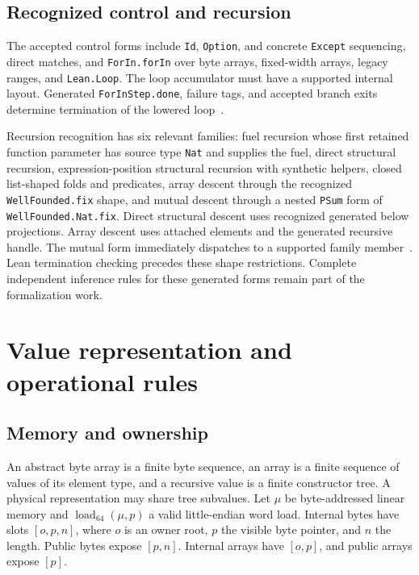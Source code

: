 \documentclass[11pt]{article}
\newcommand{\code}[1]{\texttt{#1}}
\begin{document}
\subsection{Recognized control and recursion}

The accepted control forms include \code{Id}, \code{Option}, and concrete \code{Except} sequencing, direct matches, and \code{ForIn.forIn} over byte arrays, fixed-width arrays, legacy ranges, and \code{Lean.Loop}.  The loop accumulator must have a supported internal layout.  Generated \code{ForInStep.done}, failure tags, and accepted branch exits determine termination of the lowered loop~\cite{patterns,extract}.

Recursion recognition has six relevant families: fuel recursion whose first retained function parameter has source type \code{Nat} and supplies the fuel, direct structural recursion, expression-position structural recursion with synthetic helpers, closed list-shaped folds and predicates, array descent through the recognized \code{WellFounded.fix} shape, and mutual descent through a nested \code{PSum} form of \code{WellFounded.Nat.fix}.  Direct structural descent uses recognized generated below projections.  Array descent uses attached elements and the generated recursive handle.  The mutual form immediately dispatches to a supported family member~\cite{structural,extract}.  Lean termination checking precedes these shape restrictions.  Complete independent inference rules for these generated forms remain part of the formalization work.

\section{Value representation and operational rules}

\subsection{Memory and ownership}

An abstract byte array is a finite byte sequence, an array is a finite sequence of values of its element type, and a recursive value is a finite constructor tree.  A physical representation may share tree subvalues.  Let $\mu$ be byte-addressed linear memory and $\operatorname{load}_{64}(\mu,p)$ a valid little-endian word load.  Internal bytes have slots $[o,p,n]$, where $o$ is an owner root, $p$ the visible byte pointer, and $n$ the length.  Public bytes expose $[p,n]$.  Internal arrays have $[o,p]$, and public arrays expose $[p]$.
\end{document}
